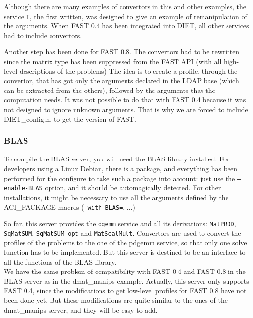 Although there are many examples of convertors in this and other examples, the
service \texttt{T}, the first written, was designed to give an example of
remanipulation of the arguments. When FAST 0.4 has been integrated into DIET,
all other services had to include convertors.

Another step has been done for FAST 0.8. The convertors had to be rewritten
since the matrix type has been suppressed from the FAST API (with all high-level
descriptions of the problems) The idea is to create a profile, through the
convertor, that has got only the arguments declared in the LDAP base (which can
be extracted from the others), followed by the arguments that the computation
needs. It was not possible to do that with FAST 0.4 because it was not designed
to ignore unknown arguments. That is why we are forced to include
\textsf{DIET\_config.h}, to get the version of FAST.
\\



\subsubsection{BLAS}

To compile the BLAS server, you will need the BLAS library installed. For
developers using a Linux Debian, there is a package, and everything has been
performed for the configure to take such a package into account: just use the
\texttt{--enable-BLAS} option, and it should be automagically detected. For
other installations, it might be necessary to use all the arguments defined by
the ACI\_PACKAGE macros (\texttt{--with-BLAS=}, ...)

So far, this server provides the \texttt{dgemm} service and all its derivations:
\texttt{MatPROD}, \texttt{SqMatSUM}, \texttt{SqMatSUM\_opt} and
\texttt{MatScalMult}. Convertors are used to convert the profiles of the
problems to the one of the pdgemm service, so that only one solve function has
to be implemented. But this server is destined to be an interface to all the
functions of the BLAS library.
\\

We have the same problem of compatibility with FAST 0.4 and FAST 0.8 in the BLAS
server as in the dmat\_manips example. Actually, this server only supports
FAST 0.4, since the modifications to get low-level profiles for FAST 0.8 have not
been done yet. But these modifications are quite similar to the ones of the
dmat\_manips server, and they will be easy to add.


